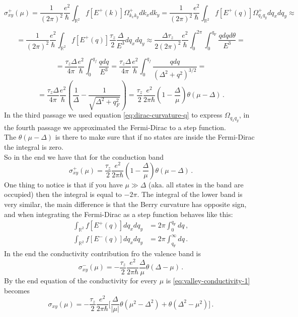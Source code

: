 \[
    \sigma^+_{xy}(\mu)=
    \frac{1}{(2\pi)^2}\frac {e^2}\hbar\int_{\mathbb R^2} f[E^+(k)]\Omega^+_{k_xk_y}dk_xdk_y=
    \frac{1}{(2\pi)^2}\frac {e^2}\hbar\int_{\mathbb R^2} f[E^+(q)]\Omega^+_{q_xq_y}dq_xdq_y\approx
\]

\[
    =\frac1{(2\pi)^2}\frac {e^2}\hbar \int_{\mathbb R^2}f[E^+(q)]\frac{\tau_z} 2\frac\Delta {E^3}dq_xdq_y
    \approx\frac{\Delta\tau_z}{2(2\pi)^2}\frac {e^2}\hbar
    \int_{0}^{2\pi}\int_{0}^{q_\textrm{F}} \frac{qdqd\theta}{E^3}=
\]

\[
    =\frac{\tau_z\Delta}{4\pi}\frac {e^2}\hbar
    \int_0^{q_f}\frac{qdq}{E^3} =\frac{\tau_z\Delta}{4\pi}\frac {e^2}\hbar\int_0^{q_f}\frac{qdq}{(\Delta^2+q^2)^{3/2}}= 
\]
\[
    =\frac{\tau_z\Delta}{4\pi}\frac {e^2}\hbar
    \left(\frac 1\Delta - \frac 1{\sqrt{\Delta^2+q_F^2}}\right)
    =\frac{\tau_z}2\frac{e^2}{2\pi\hbar}
    \left(
        1-\frac{\Delta}\mu
    \right)\theta(\mu-\Delta)\,.
\]
In the third passage we used equation \ref{eq:dirac-curvature-q} to express $\Omega_{q_xq_y}$, in the fourth passage we approximated the Fermi-Dirac to a step function.\\
The $\theta(\mu-\Delta)$ is there to make sure that if no states are inside the Fermi-Dirac the integral is zero.\\
So in the end we have that for the conduction band
\begin{equation}
    \sigma_{xy}^+(\mu)=
    \frac{\tau_z}2\frac{e^2}{2\pi\hbar}
    \left(
        1-\frac{\Delta}\mu
    \right)\theta(\mu-\Delta)\,.
\end{equation}
One thing to notice is that if you have $\mu \gg \Delta$ (aka. all states in the band are occupied) then the integral is equal to $-2\pi$. The integral of the lower band is very similar, the main difference is that the Berry curvature has opposite sign, and when integrating the Fermi-Dirac as a step function behaves like this:
\begin{equation}
\begin{split}
    \int_{\mathbb R^2}f[E^+(q)]dq_xdq_y&=
    2\pi\int_{0}^{q_\textrm{F}}dq\,,\\
    \int_{\mathbb R^2}f[E^-(q)]dq_xdq_y&=
    2\pi\int_{q_\textrm{F}}^\infty dq\,.
\end{split}
\end{equation}
In the end the conductivity contribution fro the valence band is
\begin{equation}
    \sigma_{xy}^-(\mu)=
    -\frac{\tau_z}2\frac{e^2}{2\pi\hbar}
        \frac{\Delta}\mu\theta(\Delta-\mu)\,.
\end{equation}
By the end equation of the conductivity for every $\mu$ is  \ref{eq:valley-conductivity-1} becomes
\begin{equation}
    \sigma_{xy}(\mu)=-\frac{\tau_z}2\frac {e^2}{2\pi \hbar}\Bigg[\frac{\Delta}{|\mu|}\theta\left(\mu^2-\Delta^2\right) + \theta\left(\Delta^2-\mu^2\right)\Bigg]\,.
    \label{eq:valley-conductivity-2}
\end{equation}

